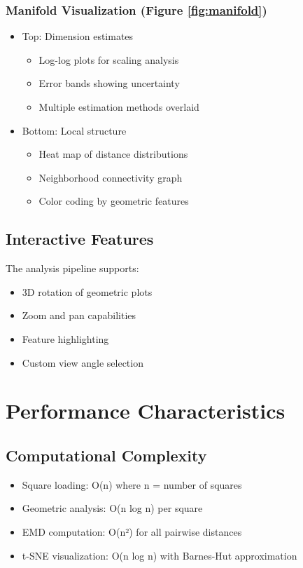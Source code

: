 \documentclass[11pt]{article}
\begin{document}
\subsubsection{Manifold Visualization (Figure \ref{fig:manifold})}
\begin{itemize}
    \item Top: Dimension estimates
    \begin{itemize}
        \item Log-log plots for scaling analysis
        \item Error bands showing uncertainty
        \item Multiple estimation methods overlaid
    \end{itemize}
    \item Bottom: Local structure
    \begin{itemize}
        \item Heat map of distance distributions
        \item Neighborhood connectivity graph
        \item Color coding by geometric features
    \end{itemize}
\end{itemize}

\subsection{Interactive Features}
The analysis pipeline supports:
\begin{itemize}
    \item 3D rotation of geometric plots
    \item Zoom and pan capabilities
    \item Feature highlighting
    \item Custom view angle selection
\end{itemize}

\section{Performance Characteristics}
\label{sec:performance}

\subsection{Computational Complexity}
\begin{itemize}
    \item Square loading: O(n) where n = number of squares
    \item Geometric analysis: O(n log n) per square
    \item EMD computation: O(n²) for all pairwise distances
    \item t-SNE visualization: O(n log n) with Barnes-Hut approximation
\end{itemize}
\end{document}

